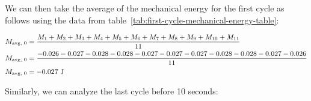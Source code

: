 \documentclass[titlepage]{article}
\begin{document}
            We can then take the average of the mechanical energy for the first cycle as follows using the data from table~\ref{tab:first-cycle-mechanical-energy-table}:
            
            \begin{equation}
                \small
                \begin{aligned}
                    M_{\text{avg, 0}} &= \frac{M_1 + M_2 + M_3 + M_4 + M_5 + M_6 + M_7 + M_8 + M_9 + M_{10} + M_{11}}{11} \\
                    M_{\text{avg, 0}} &= \frac{-0.026 -0.027 -0.028 -0.028 -0.027 -0.027 -0.027 -0.028 -0.028 -0.027 -0.026}{11} \\
                    M_{\text{avg, 0}} &= -0.027 \text{ J} \\
                \end{aligned}\label{eq:average-mechanical-energy-first-cycle}
            \end{equation}
            
            Similarly, we can analyze the last cycle before 10 seconds:
            
\end{document}
